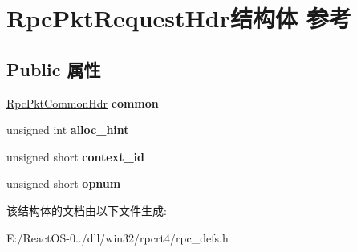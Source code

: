 \hypertarget{struct_rpc_pkt_request_hdr}{}\section{Rpc\+Pkt\+Request\+Hdr结构体 参考}
\label{struct_rpc_pkt_request_hdr}
\subsection*{Public 属性}
\begin{DoxyCompactItemize}
\item 
\mbox{\label{struct_rpc_pkt_request_hdr_a9e2d5a01f3bbab0b1ae5e92caf322c02}} 
\hyperlink{struct_rpc_pkt_common_hdr}{Rpc\+Pkt\+Common\+Hdr} {\bfseries common}
\item 
\mbox{\label{struct_rpc_pkt_request_hdr_a5ca7715124b0aa6a6ccd96509f624969}} 
unsigned int {\bfseries alloc\+\_\+hint}
\item 
\mbox{\label{struct_rpc_pkt_request_hdr_a6a5a0281134be4e53aaecc200d5d24c8}} 
unsigned short {\bfseries context\+\_\+id}
\item 
\mbox{\label{struct_rpc_pkt_request_hdr_aad886f50292203a48d96855be2462af0}} 
unsigned short {\bfseries opnum}
\end{DoxyCompactItemize}


该结构体的文档由以下文件生成\+:\begin{DoxyCompactItemize}
\item 
E\+:/\+React\+O\+S-\/0../dll/win32/rpcrt4/rpc\+\_\+defs.\+h\end{DoxyCompactItemize}
